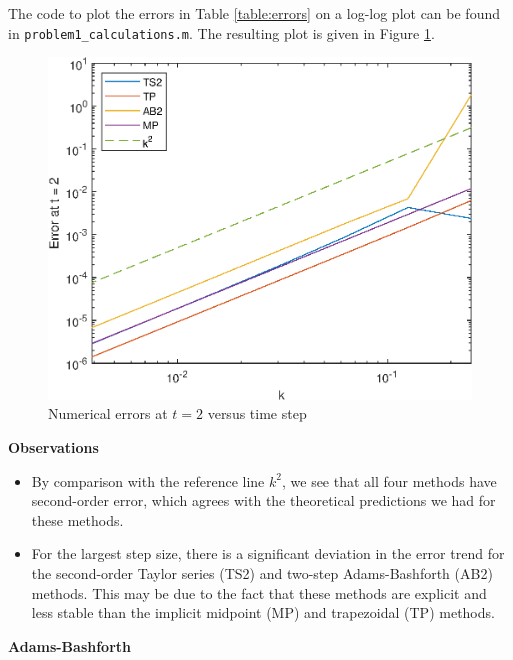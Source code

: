 \documentclass{homework}
\begin{document}
\begin{alphaparts}
		\questionpart The code to plot the errors in Table \ref{table:errors} on a log-log plot can be found in \verb*|problem1_calculations.m|. The resulting plot is given in Figure \ref{fig:error_plot}.
		\begin{figure}[h]
			\centering
			\includegraphics{p1f_plot.eps}
			\caption{Numerical errors at $t = 2$ versus time step}
			\label{fig:error_plot}
		\end{figure}
		
		\textbf{Observations}
		\begin{itemize}
			\item By comparison with the reference line $k^2$, we see that all four methods have second-order error, which agrees with the theoretical predictions we had for these methods.
			\item For the largest step size, there is a significant deviation in the error trend for the second-order Taylor series (TS2) and two-step Adams-Bashforth (AB2) methods. This may be due to the fact that these methods are explicit and less stable than the implicit midpoint (MP) and trapezoidal (TP) methods.
		\end{itemize}
	\end{alphaparts}
	
	\question
	
	\textbf{Adams-Bashforth}
	
\end{document}
